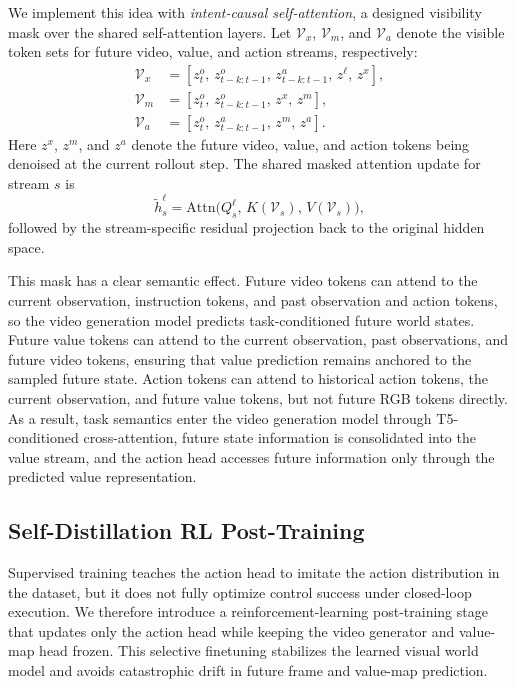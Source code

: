 \documentclass{article}
\begin{document}
We implement this idea with \emph{intent-causal self-attention}, a designed visibility mask over the shared self-attention layers. Let $\mathcal{V}_x$, $\mathcal{V}_m$, and $\mathcal{V}_a$ denote the visible token sets for future video, value, and action streams, respectively:
\begin{equation}
\begin{aligned}
\mathcal{V}_x &= \left[z_t^{o},\, z_{t-k:t-1}^{o},\, z_{t-k:t-1}^{a},\, z^{\ell},\, z^{x}\right],\\
\mathcal{V}_m &= \left[z_t^{o},\, z_{t-k:t-1}^{o},\, z^{x},\, z^{m}\right],\\
\mathcal{V}_a &= \left[z_t^{o},\, z_{t-k:t-1}^{a},\, z^{m},\, z^{a}\right].
\end{aligned}
\end{equation}
Here $z^{x}$, $z^{m}$, and $z^{a}$ denote the future video, value, and action tokens being denoised at the current rollout step. The shared masked attention update for stream $s$ is
\begin{equation}
\tilde{h}_s^\ell
=
\mathrm{Attn}\!\bigl(
Q_s^\ell,\,
K(\mathcal{V}_s),\,
V(\mathcal{V}_s)
\bigr),
\end{equation}
followed by the stream-specific residual projection back to the original hidden space.

This mask has a clear semantic effect. Future video tokens can attend to the current observation, instruction tokens, and past observation and action tokens, so the video generation model predicts task-conditioned future world states. Future value tokens can attend to the current observation, past observations, and future video tokens, ensuring that value prediction remains anchored to the sampled future state. Action tokens can attend to historical action tokens, the current observation, and future value tokens, but not future RGB tokens directly. As a result, task semantics enter the video generation model through T5-conditioned cross-attention, future state information is consolidated into the value stream, and the action head accesses future information only through the predicted value representation.


\subsection{Self-Distillation RL Post-Training}

Supervised training teaches the action head to imitate the action distribution in the dataset, but it does not fully optimize control success under closed-loop execution. We therefore introduce a reinforcement-learning post-training stage that updates only the action head while keeping the video generator and value-map head frozen. This selective finetuning stabilizes the learned visual world model and avoids catastrophic drift in future frame and value-map prediction.
\end{document}
